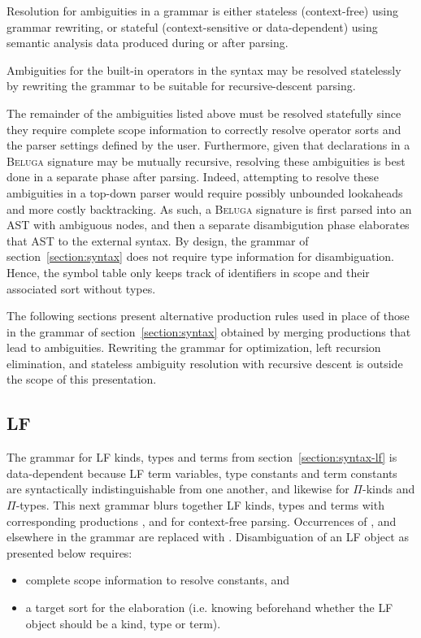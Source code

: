 \documentclass[11pt]{article}
\newcommand{\Beluga}{\textsc{Beluga}\xspace}
\newcommand{\LF}{\textsc{LF}\xspace}
\begin{document}
Resolution for ambiguities in a grammar is either stateless (context-free) using grammar rewriting, or stateful (context-sensitive or data-dependent) using semantic analysis data produced during or after parsing.

Ambiguities for the built-in operators in the syntax may be resolved statelessly by rewriting the grammar to be suitable for recursive-descent parsing.

The remainder of the ambiguities listed above must be resolved statefully since they require complete scope information to correctly resolve operator sorts and the parser settings defined by the user.
Furthermore, given that declarations in a \Beluga signature may be mutually recursive, resolving these ambiguities is best done in a separate phase after parsing.
Indeed, attempting to resolve these ambiguities in a top-down parser would require possibly unbounded lookaheads and more costly backtracking.
As such, a \Beluga signature is first parsed into an \ac{AST} with ambiguous nodes, and then a separate disambigution phase elaborates that \ac{AST} to the external syntax.
By design, the grammar of section~\ref{section:syntax} does not require type information for disambiguation.
Hence, the symbol table only keeps track of identifiers in scope and their associated sort without types.

The following sections present alternative production rules used in place of those in the grammar of section~\ref{section:syntax} obtained by merging productions that lead to ambiguities.
Rewriting the grammar for optimization, left recursion elimination, and stateless ambiguity resolution with recursive descent is outside the scope of this presentation.

\subsection{\LF}

The grammar for \LF kinds, types and terms from section~\ref{section:syntax-lf} is data-dependent because \LF term variables, type constants and term constants are syntactically indistinguishable from one another, and likewise for $ \Pi $-kinds and $ \Pi $-types.
This next grammar blurs together \LF kinds, types and terms with corresponding productions ,  and  for context-free parsing.
Occurrences of ,  and  elsewhere in the grammar are replaced with .
Disambiguation of an \LF object as presented below requires:
\begin{itemize}
\item complete scope information to resolve constants, and
\item a target sort for the elaboration (i.e. knowing beforehand whether the \LF object should be a kind, type or term).
\end{itemize}
\end{document}
